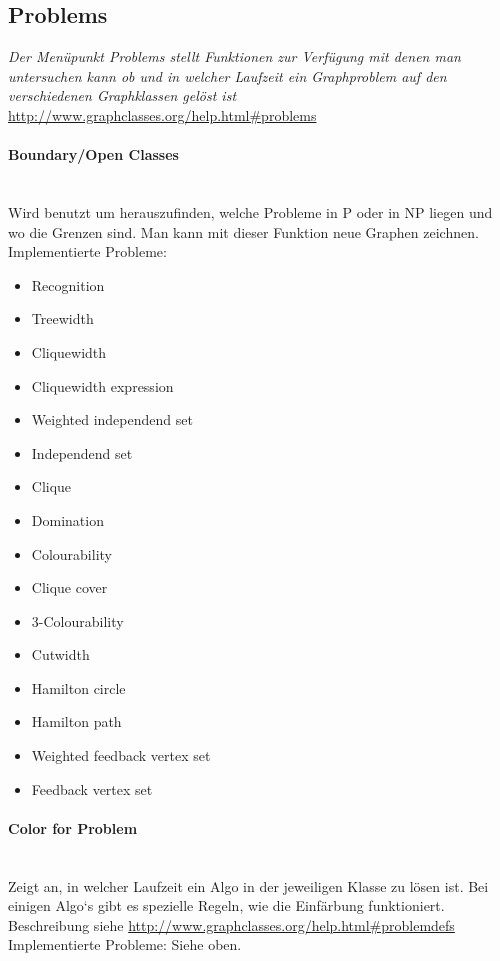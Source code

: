 \documentclass[10pt,a4paper]{article}
\begin{document}
\subsection{Problems}
\emph{Der Menüpunkt Problems stellt Funktionen zur Verfügung mit denen man untersuchen kann ob und in welcher Laufzeit ein Graphproblem auf den verschiedenen Graphklassen gelöst ist} \\
\href{http://www.graphclasses.org/help.html\#problems}{http://www.graphclasses.org/help.html\#problems}
\paragraph{Boundary/Open Classes} \ \\
Wird benutzt um herauszufinden, welche Probleme in P oder in NP liegen und wo die Grenzen sind. Man kann mit dieser Funktion neue Graphen zeichnen.\\
Implementierte Probleme:\\
\begin{minipage}{\linewidth}
{\small \begin{itemize}
\item Recognition
\item Treewidth
\item Cliquewidth
\item Cliquewidth expression
\item Weighted independend set
\item Independend set
\item Clique
\item Domination
\item Colourability
\item Clique cover
\item 3-Colourability
\item Cutwidth
\item Hamilton circle
\item Hamilton path
\item Weighted feedback vertex set
\item Feedback vertex set
\end{itemize}}
\end{minipage}
\paragraph{Color for Problem} \ \\
Zeigt an, in welcher Laufzeit ein Algo in der jeweiligen Klasse zu lösen ist.  Bei einigen Algo`s gibt es spezielle Regeln, wie die Einfärbung funktioniert. Beschreibung siehe \href{http://www.graphclasses.org/help.html\#problemdefs}{http://www.graphclasses.org/help.html\#problemdefs} \\
Implementierte Probleme:
Siehe oben.
\end{document}
